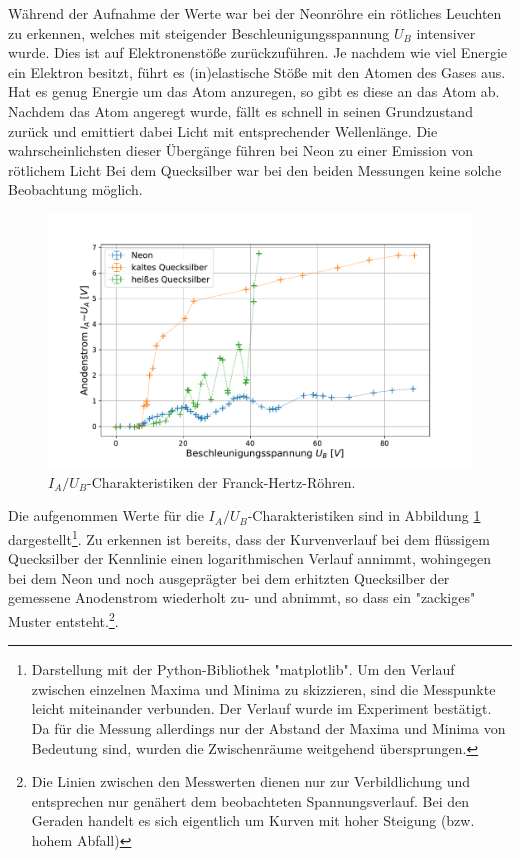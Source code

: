 	Während der Aufnahme der Werte war bei der Neonröhre ein rötliches Leuchten zu erkennen, welches mit steigender Beschleunigungsspannung $U_B$ intensiver wurde. 
	Dies ist auf Elektronenstöße zurückzuführen.
	Je nachdem wie viel Energie ein Elektron besitzt, führt es (in)elastische Stöße mit den Atomen des Gases aus. 
	Hat es genug Energie um das Atom anzuregen, so gibt es diese an das Atom ab.
	Nachdem das Atom angeregt wurde, fällt es schnell in seinen Grundzustand zurück und emittiert dabei Licht mit entsprechender Wellenlänge.
	Die wahrscheinlichsten dieser Übergänge führen bei Neon zu einer Emission von rötlichem Licht 
	Bei dem Quecksilber war bei den beiden Messungen keine solche Beobachtung möglich.
	
	\begin{figure}[ht]
		\centering
		\includegraphics[width=\textwidth]{data/CharakteristikZusammen.pdf}
		\caption{$I_A/U_B$-Charakteristiken der Franck-Hertz-Röhren.} 
		\label{fig:Kurve}	
	\end{figure}
	Die aufgenommen Werte für die $I_A/U_B$-Charakteristiken sind in Abbildung \ref{fig:Kurve} dargestellt\footnote{Darstellung mit der Python-Bibliothek "matplotlib". Um den Verlauf zwischen einzelnen Maxima und Minima zu skizzieren, sind die Messpunkte leicht miteinander verbunden. Der Verlauf wurde im Experiment bestätigt. Da für die Messung allerdings nur der Abstand der Maxima und Minima von Bedeutung sind, wurden die Zwischenräume weitgehend übersprungen.}. 
	Zu erkennen ist bereits, dass der Kurvenverlauf bei dem flüssigem Quecksilber der Kennlinie einen logarithmischen Verlauf annimmt, wohingegen bei dem Neon und noch ausgeprägter bei dem erhitzten Quecksilber der gemessene Anodenstrom wiederholt zu- und abnimmt, so dass ein "zackiges" Muster entsteht.\footnote{Die Linien zwischen den Messwerten dienen nur zur Verbildlichung und entsprechen nur genähert dem beobachteten Spannungsverlauf. Bei den Geraden handelt es sich eigentlich um  Kurven mit hoher Steigung (bzw. hohem Abfall)}. 
